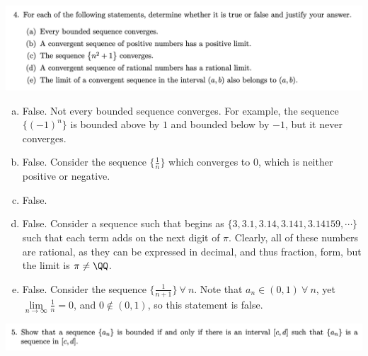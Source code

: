 \documentclass[12pt]{scrartcl}
\begin{document}
\includegraphics[width=15cm]{4.png}

\begin{enumerate}[a.]
  
\item False. Not every bounded sequence converges. For example, the sequence $\{(-1)^{n}\}$
is bounded above by $1$ and bounded below by $-1$, but it never converges.
\item False. Consider the sequence $\{\frac{1}{n}\}$ which converges to $0$, which is neither 
positive or negative.
\item False. 
\item False. Consider a sequence such that begins as $\{3, 3.1, 3.14, 3.141, 3.14159, \cdots \}$
such that each term adds on the next digit of $\pi$. Clearly, all of these numbers are rational, as they can 
be expressed in decimal, and thus fraction, form, but the limit is $\pi \neq \QQ$. 
\item False. Consider the sequence $\{\frac{1}{n + 1}\} \ \forall \ n$. Note that $a_n \in (0, 1) \ \forall \ n$, 
yet $\underset{n\to\infty}{\lim}\frac{1}{n} = 0$, and $0 \notin (0, 1)$, so this statement is false. 

\end{enumerate}

\newpage
\includegraphics[width=15cm]{5.png}
\end{document}

